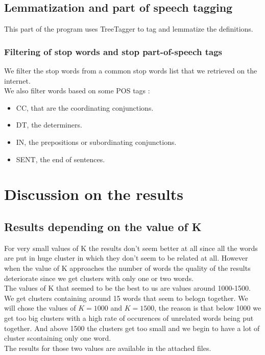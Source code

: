 \documentclass{eplDoc}
\begin{document}
\subsection{Lemmatization and part of speech tagging}
This part of the program uses TreeTagger to tag and lemmatize the definitions.

\subsubsection{Filtering of stop words and stop part-of-speech tags}

We filter the stop words from a common stop words list that we retrieved on the internet. \\ 
We also filter words based on some POS tags : 
\begin{itemize}
	\item CC, that are the coordinating conjunctions.
	\item DT, the determiners.
	\item IN, the prepositions or subordinating conjunctions.
	\item SENT, the end of sentences.
\end{itemize}

\section{Discussion on the results}

\subsection{Results depending on the value of K}
For very small values of K the results don't seem better at all since all the words are put in huge cluster in which they don't seem to be related at all. However when the value of K approaches the number of words the quality of the results deteriorate since we get clusters with only one or two words. \\ 

The values of K that seemed to be the best to us are values around 1000-1500. We get clusters containing around 15 words that seem to belogn together. We will chose the values of $K=1000$ and $K=1500$, the reason is that below 1000 we get too big clusters with a high rate of occurences of unrelated words being put together. And above 1500 the clusters get too small and we begin to have a lot of cluster scontaining only one word. \\ 
The results for those two values are available in the attached files. 
\end{document}
